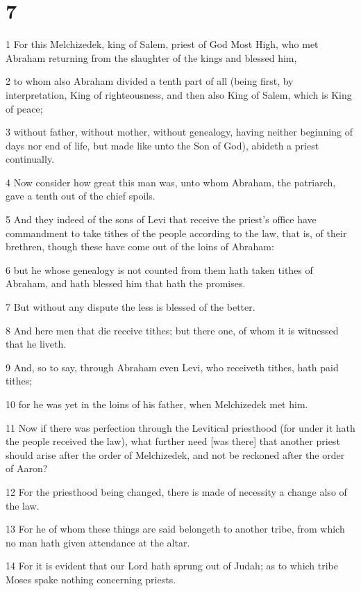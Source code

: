 \chapter{7}

\par 1 For this Melchizedek, king of Salem, priest of God Most High, who met Abraham returning from the slaughter of the kings and blessed him,
\par 2 to whom also Abraham divided a tenth part of all (being first, by interpretation, King of righteousness, and then also King of Salem, which is King of peace;
\par 3 without father, without mother, without genealogy, having neither beginning of days nor end of life, but made like unto the Son of God), abideth a priest continually.
\par 4 Now consider how great this man was, unto whom Abraham, the patriarch, gave a tenth out of the chief spoils.
\par 5 And they indeed of the sons of Levi that receive the priest's office have commandment to take tithes of the people according to the law, that is, of their brethren, though these have come out of the loins of Abraham:
\par 6 but he whose genealogy is not counted from them hath taken tithes of Abraham, and hath blessed him that hath the promises.
\par 7 But without any dispute the less is blessed of the better.
\par 8 And here men that die receive tithes; but there one, of whom it is witnessed that he liveth.
\par 9 And, so to say, through Abraham even Levi, who receiveth tithes, hath paid tithes;
\par 10 for he was yet in the loins of his father, when Melchizedek met him.
\par 11 Now if there was perfection through the Levitical priesthood (for under it hath the people received the law), what further need [was there] that another priest should arise after the order of Melchizedek, and not be reckoned after the order of Aaron?
\par 12 For the priesthood being changed, there is made of necessity a change also of the law.
\par 13 For he of whom these things are said belongeth to another tribe, from which no man hath given attendance at the altar.
\par 14 For it is evident that our Lord hath sprung out of Judah; as to which tribe Moses spake nothing concerning priests.
